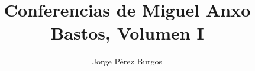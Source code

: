 \documentclass[11pt,twoside,openright]{memoir}
\title{Conferencias de Miguel Anxo Bastos, Volumen I}
\author{Jorge Pérez Burgos}
\begin{document}
\maketitle
\doclicenseThis

\clearpage

\tableofcontents

\mainmatter





\printbibliography
\end{document}
